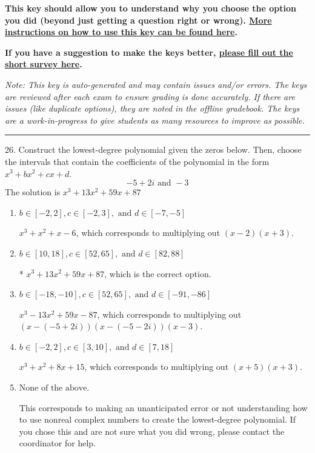 \documentclass{article}[14pt]
\begin{document}
\textbf{This key should allow you to understand why you choose the option you did (beyond just getting a question right or wrong). \href{https://xronos.clas.ufl.edu/mac1105spring2020/courseDescriptionAndMisc/Exams/LearningFromResults}{More instructions on how to use this key can be found here}.}

\textbf{If you have a suggestion to make the keys better, \href{https://forms.gle/CZkbZmPbC9XALEE88}{please fill out the short survey here}.}

\textit{Note: This key is auto-generated and may contain issues and/or errors. The keys are reviewed after each exam to ensure grading is done accurately. If there are issues (like duplicate options), they are noted in the offline gradebook. The keys are a work-in-progress to give students as many resources to improve as possible.}

\rule{\textwidth}{0.4pt}

26. Construct the lowest-degree polynomial given the zeros below. Then, choose the intervals that contain the coefficients of the polynomial in the form $x^3+bx^2+cx+d$.
$$ -5 + 2i \text{ and } -3 $$ 
The solution is $ x^{3} +13 x^{2} +59 x + 87 $ 

\begin{enumerate}[label=\Alph*.] 
\item $ b \in [-2, 2], c \in [-2, 3], \text{ and } d \in [-7, -5] $ 

 $x^{3} + x^{2} +x -6$, which corresponds to multiplying out $(x -2)(x + 3)$. 
\item $ b \in [10, 18], c \in [52, 65], \text{ and } d \in [82, 88] $ 

 * $x^{3} +13 x^{2} +59 x + 87$, which is the correct option. 
\item $ b \in [-18, -10], c \in [52, 65], \text{ and } d \in [-91, -86] $ 

 $x^{3} -13 x^{2} +59 x -87$, which corresponds to multiplying out $(x-(-5 + 2i))(x-(-5 - 2i))(x -3)$. 
\item $ b \in [-2, 2], c \in [3, 10], \text{ and } d \in [7, 18] $ 

 $x^{3} + x^{2} +8 x + 15$, which corresponds to multiplying out $(x + 5)(x + 3)$. 
\item $ \text{None of the above.} $ 

 This corresponds to making an unanticipated error or not understanding how to use nonreal complex numbers to create the lowest-degree polynomial. If you chose this and are not sure what you did wrong, please contact the coordinator for help. 
\end{enumerate} 
 
\end{document}
